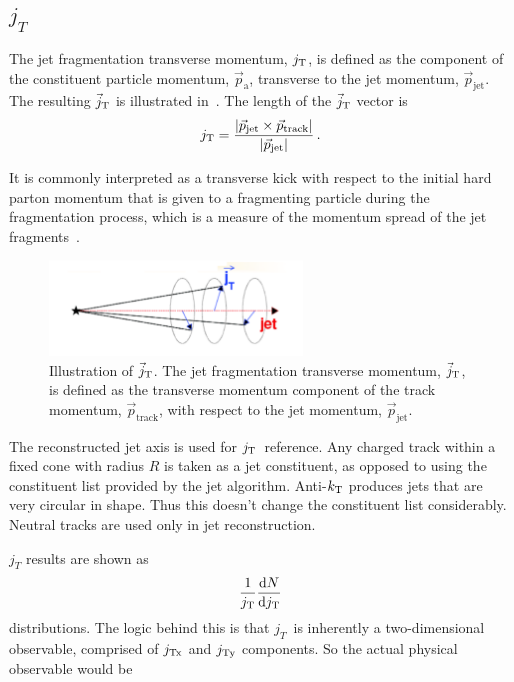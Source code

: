 \subsection{$j_T$ }
The jet fragmentation transverse momentum, $j_{\rm T}$, is defined as the component of the constituent particle momentum, $\vec{p}_{\mathrm{a}}$, transverse to the jet momentum, $\vec{p}_{\mathrm{jet}}$. The resulting $\vec{j}_{\rm T}$ is illustrated in~. The length of the $\vec{j}_{\rm T}$ vector is
  \begin{equation}
    j_{\rm T} = \frac{|\vec{p}_{\mathrm{jet}} \times \vec{p}_{\mathrm{track}}|}{|\vec{p}_{\mathrm{jet}}|} \,.
  \label{eq:jtdefinition}
  \end{equation}

It is commonly interpreted as a transverse kick with respect to the initial hard parton momentum that is given to a fragmenting particle during the fragmentation process, which is a measure of the momentum spread of the jet fragments~\cite{}. 

   \begin{figure}
    \begin{center}
      \includegraphics[width = 0.60\textwidth]{figures/jt_def}
    \end{center}
    \caption{Illustration of $\vec{j}_{\rm T}$. The jet fragmentation transverse momentum, $\vec{j}_{\rm T}$, is defined as the transverse momentum component of the track momentum, $\vec{p}_{\mathrm{track}}$, with respect to the jet momentum, $\vec{p}_{\mathrm{jet}}$.}
    \label{fig:jtdefinition}
  \end{figure}

The reconstructed jet axis is used for $j_{\rm T}$ reference. Any charged track within a fixed cone with radius $R$ is taken as a jet constituent, as opposed to using the constituent list provided by the jet algorithm. Anti-$k_{\rm T}$ produces jets that are very circular in shape. Thus this doesn't change the constituent list considerably. Neutral tracks are used only in jet reconstruction.
 
$j_T$ results are shown as 
\begin{equation}
\frac{1}{j_{\rm T}}\frac{\mathrm{d}N}{\mathrm{d}j_{\rm T}}
\end{equation}
distributions. The logic behind this is that $j_T$ is inherently a two-dimensional observable, comprised of $j_{\rm Tx}$ and $j_{\rm Ty}$ components. So the actual physical observable would be 
 
